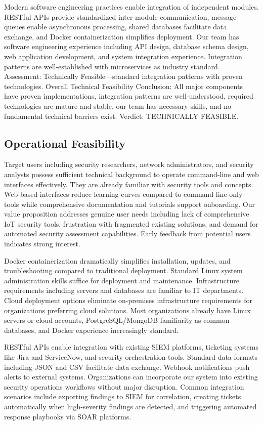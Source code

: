 Modern software engineering practices enable integration of independent modules. RESTful APIs provide standardized inter-module communication, message queues enable asynchronous processing, shared databases facilitate data exchange, and Docker containerization simplifies deployment. Our team has software engineering experience including API design, database schema design, web application development, and system integration experience. Integration patterns are well-established with microservices as industry standard. Assessment: Technically Feasible---standard integration patterns with proven technologies. Overall Technical Feasibility Conclusion: All major components have proven implementations, integration patterns are well-understood, required technologies are mature and stable, our team has necessary skills, and no fundamental technical barriers exist. Verdict: TECHNICALLY FEASIBLE.

\subsection{Operational Feasibility}

Target users including security researchers, network administrators, and security analysts possess sufficient technical background to operate command-line and web interfaces effectively. They are already familiar with security tools and concepts. Web-based interfaces reduce learning curves compared to command-line-only tools while comprehensive documentation and tutorials support onboarding. Our value proposition addresses genuine user needs including lack of comprehensive IoT security tools, frustration with fragmented existing solutions, and demand for automated security assessment capabilities. Early feedback from potential users indicates strong interest.

Docker containerization dramatically simplifies installation, updates, and troubleshooting compared to traditional deployment. Standard Linux system administration skills suffice for deployment and maintenance. Infrastructure requirements including servers and databases are familiar to IT departments. Cloud deployment options eliminate on-premises infrastructure requirements for organizations preferring cloud solutions. Most organizations already have Linux servers or cloud accounts, PostgreSQL/MongoDB familiarity as common databases, and Docker experience increasingly standard.

RESTful APIs enable integration with existing SIEM platforms, ticketing systems like Jira and ServiceNow, and security orchestration tools. Standard data formats including JSON and CSV facilitate data exchange. Webhook notifications push alerts to external systems. Organizations can incorporate our system into existing security operations workflows without major disruption. Common integration scenarios include exporting findings to SIEM for correlation, creating tickets automatically when high-severity findings are detected, and triggering automated response playbooks via SOAR platforms.

